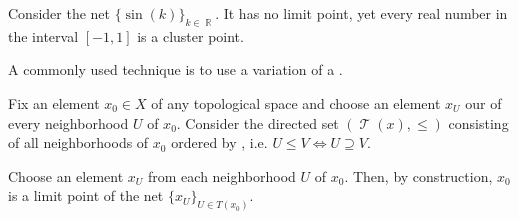 \begin{example}\label{ex:cluster_points/sine}
  Consider the net \( \{ \sin(k) \}_{k \in \BbbR} \). It has no limit point, yet every real number in the interval \( [-1, 1] \) is a cluster point.
\end{example}

\begin{example}\label{ex:reverse_inclusion_net}
  A commonly used technique is to use a variation of a .

  Fix an element \( x_0 \in X \) of any topological space and choose an element \( x_U \) our of every neighborhood \( U \) of \( x_0 \). Consider the directed set \( (\mscrT(x), \leq) \) consisting of all neighborhoods of \( x_0 \) ordered by , i.e. \( U \leq V \iff U \supseteq V \).

  Choose an element \( x_U \) from each neighborhood \( U \) of \( x_0 \). Then, by construction, \( x_0 \) is a limit point of the net \( \{ x_U \}_{U \in T(x_0)} \).
\end{example}

